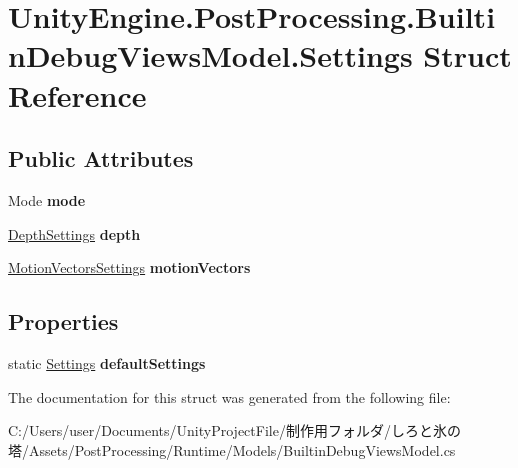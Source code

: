 \hypertarget{struct_unity_engine_1_1_post_processing_1_1_builtin_debug_views_model_1_1_settings}{}\section{Unity\+Engine.\+Post\+Processing.\+Builtin\+Debug\+Views\+Model.\+Settings Struct Reference}
\label{struct_unity_engine_1_1_post_processing_1_1_builtin_debug_views_model_1_1_settings}
\subsection*{Public Attributes}
\begin{DoxyCompactItemize}
\item 
\mbox{\label{struct_unity_engine_1_1_post_processing_1_1_builtin_debug_views_model_1_1_settings_a64bfde9afcab454ff4cae8093cbfc961}} 
Mode {\bfseries mode}
\item 
\mbox{\label{struct_unity_engine_1_1_post_processing_1_1_builtin_debug_views_model_1_1_settings_a7283a05c8d37043a2643d573943f20b7}} 
\hyperlink{struct_unity_engine_1_1_post_processing_1_1_builtin_debug_views_model_1_1_depth_settings}{Depth\+Settings} {\bfseries depth}
\item 
\mbox{\label{struct_unity_engine_1_1_post_processing_1_1_builtin_debug_views_model_1_1_settings_ae87a46433175c77452522ba4c1bc855b}} 
\hyperlink{struct_unity_engine_1_1_post_processing_1_1_builtin_debug_views_model_1_1_motion_vectors_settings}{Motion\+Vectors\+Settings} {\bfseries motion\+Vectors}
\end{DoxyCompactItemize}
\subsection*{Properties}
\begin{DoxyCompactItemize}
\item 
\mbox{\label{struct_unity_engine_1_1_post_processing_1_1_builtin_debug_views_model_1_1_settings_a3f6924d1e6965becf46634057007e552}} 
static \hyperlink{struct_unity_engine_1_1_post_processing_1_1_builtin_debug_views_model_1_1_settings}{Settings} {\bfseries default\+Settings}
\end{DoxyCompactItemize}


The documentation for this struct was generated from the following file\+:\begin{DoxyCompactItemize}
\item 
C\+:/\+Users/user/\+Documents/\+Unity\+Project\+File/制作用フォルダ/しろと氷の塔/\+Assets/\+Post\+Processing/\+Runtime/\+Models/Builtin\+Debug\+Views\+Model.\+cs\end{DoxyCompactItemize}
